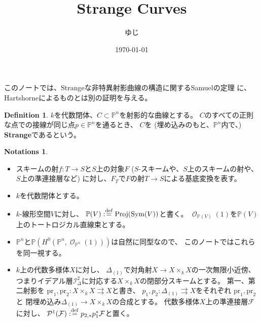 \documentclass[uplatex]{jsarticle}
\title{Strange Curves}
\author{ゆじ}
\date{\today}
\theoremstyle{definition}
\newtheorem{defi}[defi]{Definition}
\newtheorem*{notation*}{Notations}
\DeclareMathOperator{\Proj}{\mathrm{Proj}}
\DeclareMathOperator{\Sym}{\mathrm{Sym}}
\renewcommand{\P}{\mathbb{P}}
\newcommand{\mcF}{\mathcal{F}}
\newcommand{\mcI}{\mathcal{I}}
\newcommand{\mcO}{\mathcal{O}}
\newcommand{\mcP}{\mathcal{P}}
\DeclareMathOperator{\OOO}{\mcO}
\newcommand{\OO}[1]{\OOO_{#1}}
\newcommand{\dfn}{:\overset{\mathrm{\scriptsize def}}{=}}
\newcommand{\HTMLSkip}[1]{#1}
\begin{document}
\maketitle


このノートでは、Strangeな非特異射影曲線の構造に関するSamuelの定理
\cite[定理 IV.3.9]{Ha}に、Hartshorneによるものとは別の証明を与える。

\begin{defi}
  \(k\)を代数閉体、\(C\subset \P^n\)を射影的な曲線とする。
  \(C\)のすべての正則な点での接線が同じ点\(p\in \P^n\)を通るとき、
  \(C\)を (埋め込みのもと、\(\P^n\)内で、) \textbf{Strange}であるという。
\end{defi}


\begin{notation*}
  \HTMLSkip{ \ }
  \begin{itemize}
    \item
    スキームの射\(f:T\to S\)と\(S\)上の対象\(F\)
    (\(S\)-スキームや、\(S\)上のスキームの射や、\(S\)上の準連接層など)
    に対し、\(F_T\)で\(F\)の射\(T\to S\)による基底変換を表す。
    \item
    \(k\)を代数閉体とする。
    \item
    \(k\)-線形空間\(V\)に対し、
    \(\P(V) \dfn \Proj(\Sym(V))\)と書く。
    \(\OO{\P(V)}(1)\)を\(\P(V)\)上のトートロジカル直線束とする。
    \item
    \(\P^n\)と\(\P(H^0(\P^n,\OO{\P^n}(1)))\)は自然に同型なので、
    このノートではこれらを同一視する。
    \item
    \(k\)上の代数多様体\(X\)に対し、
    \(\Delta_{(1)}\)で対角射\(X\to X\times_kX\)の一次無限小近傍、
    つまりイデアル層\(\mcI_{\Delta}^2\)に対応する\(X\times_kX\)の閉部分スキームとする。
    第一、第二射影を
    \(\mathrm{pr}_1,\mathrm{pr}_2:X\times_kX\rightrightarrows X\)と書き、
    \(p_1,p_2:\Delta_{(1)}\rightrightarrows X\)をそれぞれ
    \(\mathrm{pr}_1,\mathrm{pr}_2\)と
    閉埋め込み\(\Delta_{(1)}\to X\times_kX\)の合成とする。
    代数多様体\(X\)上の準連接層\(\mcF\)に対し、
    \(\mcP^1(\mcF)\dfn p_{2,*}p_1^*\mcF\)と置く。
  \end{itemize}
\end{notation*}
\end{document}
